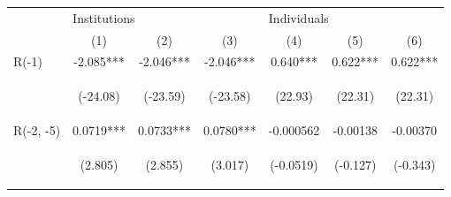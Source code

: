 \documentclass[border=0.2cm]{standalone}
\begin{document}
\begin{tabular}{lcccccc}
                      & \multicolumn{3}{l}{Institutions}               & \multicolumn{3}{l}{Individuals}                                                                                                                                                                                                                     \\
    \cmidrule(l){2-4} \cmidrule(l){5-7}
                      & (1)                                            & (2)                                            & (3)                                            & (4)                                             & (5)                                            & (6)                                            \\
    \toprule
    R(-1)             & -2.085***                                      & -2.046***                                      & -2.046***                                      & 0.640***                                        & 0.622***                                       & 0.622***                                       \\
    \vspace{4pt}      & \begin{footnotesize}(-24.08)\end{footnotesize} & \begin{footnotesize}(-23.59)\end{footnotesize} & \begin{footnotesize}(-23.58)\end{footnotesize} & \begin{footnotesize}(22.93)\end{footnotesize}   & \begin{footnotesize}(22.31)\end{footnotesize}  & \begin{footnotesize}(22.31)\end{footnotesize}  \\
    R(-2, -5)         & 0.0719***                                      & 0.0733***                                      & 0.0780***                                      & -0.000562                                       & -0.00138                                       & -0.00370                                       \\
    \vspace{4pt}      & \begin{footnotesize}(2.805)\end{footnotesize}  & \begin{footnotesize}(2.855)\end{footnotesize}  & \begin{footnotesize}(3.017)\end{footnotesize}  & \begin{footnotesize}(-0.0519)\end{footnotesize} & \begin{footnotesize}(-0.127)\end{footnotesize} & \begin{footnotesize}(-0.343)\end{footnotesize} \\

\end{tabular}
\end{document}
